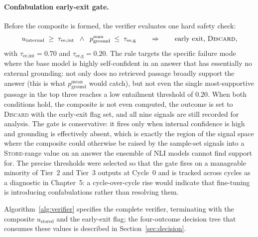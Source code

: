 \paragraph{Confabulation early-exit gate.}
Before the composite is formed, the verifier evaluates one hard safety check:
\begin{equation}
u_{\text{internal}} \;\geq\; \tau_{\text{ee,int}} \;\; \wedge \;\; p_{\text{ground}}^{\max} \;\leq\; \tau_{\text{ee,g}} \qquad \Rightarrow \qquad \text{early exit, \textsc{Discard}},
\label{eq:early-exit}
\end{equation}
with $\tau_{\text{ee,int}} = 0.70$ and $\tau_{\text{ee,g}} = 0.20$. The rule targets the specific failure mode where the base model is highly self-confident in an answer that has essentially no external grounding: not only does no retrieved passage broadly support the answer (this is what $p_{\text{ground}}^{\text{mean}}$ would catch), but not even the single most-supportive passage in the top three reaches a low entailment threshold of $0.20$. When both conditions hold, the composite is not even computed, the outcome is set to \textsc{Discard} with the early-exit flag set, and all nine signals are still recorded for analysis. The gate is conservative: it fires only when internal confidence is high and grounding is effectively absent, which is exactly the region of the signal space where the composite could otherwise be raised by the sample-set signals into a \textsc{Store}-range value on an answer the ensemble of NLI models cannot find support for. The precise thresholds were selected so that the gate fires on a manageable minority of Tier~2 and Tier~3 outputs at Cycle~0 and is tracked across cycles as a diagnostic in Chapter~5: a cycle-over-cycle rise would indicate that fine-tuning is introducing confabulations rather than resolving them.

Algorithm~\ref{alg:verifier} specifies the complete verifier, terminating with the composite $u_{\text{stored}}$ and the early-exit flag; the four-outcome decision tree that consumes these values is described in Section~\ref{sec:decision}.

